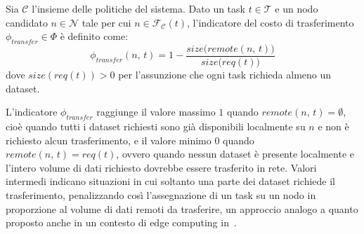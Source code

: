 \begin{optimizer}
    \label{def:indicatore_transfer}
    Sia $\mathcal{C}$ l'insieme delle politiche del sistema. Dato un task $t \in \mathcal{T}$ e un nodo candidato $n \in \mathcal{N}$ tale per cui $n \in \mathcal{F_C}(t)$, l'indicatore del costo di trasferimento $\phi_{transfer} \in \Phi$ è definito come:
    \begin{equation}
        \phi_{transfer}(n,\, t) = 1 - \dfrac{size\bigl(remote(n,\, t)\bigr)}{size\bigl(req(t)\bigr)}
    \end{equation}
    dove $size(req(t)) > 0$ per l'assunzione che ogni task richieda almeno un dataset.
\end{optimizer}

L'indicatore $\phi_{transfer}$ raggiunge il valore massimo $1$ quando $remote(n,\, t) = \emptyset$, cioè quando tutti i dataset richiesti sono già disponibili localmente su $n$ e non è richiesto alcun trasferimento, e il valore minimo $0$ quando $remote(n,\, t) = req(t)$, ovvero quando nessun dataset è presente localmente e l'intero volume di dati richiesto dovrebbe essere trasferito in rete. Valori intermedi indicano situazioni in cui soltanto una parte dei dataset richiede il trasferimento, penalizzando così l'assegnazione di un task su un nodo in proporzione al volume di dati remoti da trasferire, un approccio analogo a quanto proposto anche in un contesto di edge computing in~\cite{transfer-cost-aware-edge-scheduling}.

